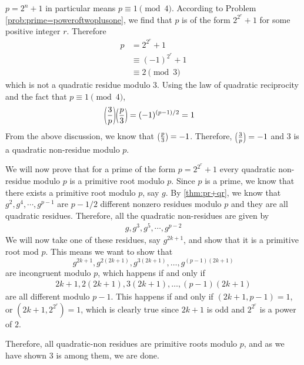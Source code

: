 \documentclass{subfile}
\begin{document}
	\begin{solution}[1]
		$p=2^n+1$ in particular means $p \equiv 1 \pmod{4}$.
		According to Problem \ref{prob:prime=poweroftwoplusone}, we find that $p$ is of the form $2^{2^r} + 1$ for some positive integer $r$. Therefore
			\begin{align*}
				p
					& = 2^{2^{r}} +1\\
					& \equiv (-1)^{2^r} +1\\
					& \equiv 2 \pmod{3}
			\end{align*}
		which is not a quadratic residue modulo $3$.
		Using the law of quadratic reciprocity and the fact that $p \equiv 1 \pmod{4}$,
			\begin{align*}
				\parenthesis{\dfrac{3}{p}}\parenthesis{\dfrac{p}{3}}
					& = (-1)^{(p-1)/2} = 1
			\end{align*}
		From the above discussion, we know that $\parenthesis{\frac{p}{3}} = -1$. Therefore, $\parenthesis{\frac{3}{p}}=-1$ and $3$ is a quadratic non-residue modulo $p$.

		We will now prove that for a prime of the form $p=2^{2^{r}}+1$ every quadratic non-residue modulo $p$ is a primitive root modulo $p$. Since $p$ is a prime, we know that there exists a primitive root modulo $p$, say $g$. By \autoref{thm:pr+qr}, we know that $g^2,g^4,\cdots,g^{p-1}$ are ${p-1}/{2}$ different nonzero residues modulo $p$ and they are all quadratic residues. Therefore, all the quadratic non-residues are given by
			\begin{align*}
				g,g^3,g^5,\cdots,g^{p-2}
			\end{align*}
		We will now take one of these residues, say $g^{2k+1}$, and show that it is a primitive root mod ${p}$. This means we want to show that $$g^{2k+1},g^{2(2k+1)},g^{3(2k+1)},\ldots,g^{(p-1)(2k+1)}$$ are incongruent modulo $p$, which  happens if and only if
			\begin{align*}
				2k+1,2(2k+1),3(2k+1),\ldots,(p-1)(2k+1)
			\end{align*}
		are all different modulo ${p-1}$. This happens if and only if $(2k+1,p-1)=1$, or $(2k+1,2^{2^r})=1$, which is clearly true since $2k+1$ is odd and $2^{2^{r}}$ is a power of $2$.

		Therefore, all quadratic-non residues are primitive roots modulo $p$, and as we have shown $3$ is among them, we are done.
	\end{solution}
\end{document}
